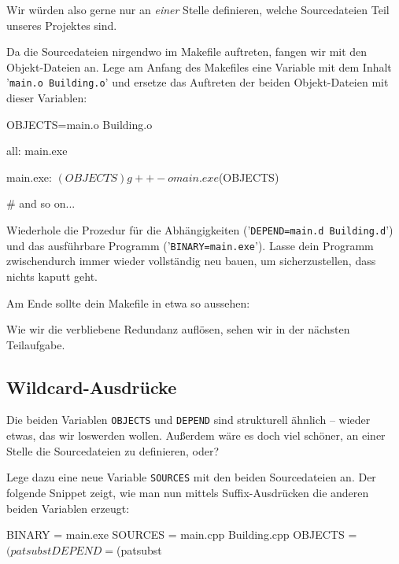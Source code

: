 Wir würden also gerne nur an \emph{einer} Stelle definieren, welche Sourcedateien Teil unseres Projektes sind.

Da die Sourcedateien nirgendwo im Makefile auftreten, fangen wir mit den Objekt-Dateien an.
Lege am Anfang des Makefiles eine Variable mit dem Inhalt '\lstinline{main.o Building.o}' und ersetze das Auftreten der beiden Objekt-Dateien mit dieser Variablen:
\begin{lstmake}
OBJECTS=main.o Building.o

all: main.exe

main.exe: $(OBJECTS)
    g++ -o main.exe $(OBJECTS)
    
# and so on...
\end{lstmake}

Wiederhole die Prozedur für die Abhängigkeiten ('\lstinline{DEPEND=main.d Building.d}') und das ausführbare Programm ('\lstinline{BINARY=main.exe}').
Lasse dein Programm zwischendurch immer wieder vollständig neu bauen, um sicherzustellen, dass nichts kaputt geht.

Am Ende sollte dein Makefile in etwa so aussehen:

Wie wir die verbliebene Redundanz auflösen, sehen wir in der nächsten Teilaufgabe.

\subsection{Wildcard-Ausdrücke}

Die beiden Variablen \lstinline{OBJECTS} und \lstinline{DEPEND} sind strukturell ähnlich -- wieder etwas, das wir loswerden wollen.
Außerdem wäre es doch viel schöner, an einer Stelle die Sourcedateien zu definieren, oder?

Lege dazu eine neue Variable \lstinline{SOURCES} mit den beiden Sourcedateien an.
Der folgende Snippet zeigt, wie man nun mittels Suffix-Ausdrücken die anderen beiden Variablen erzeugt:
\begin{lstmake}
BINARY  = main.exe
SOURCES = main.cpp Building.cpp
OBJECTS = $(patsubst %
DEPEND  = $(patsubst %
\end{lstmake}

